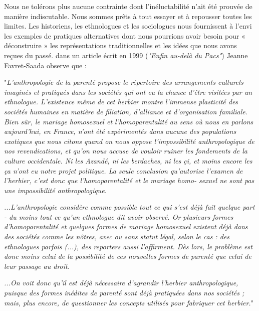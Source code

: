   Nous ne tolérons plus aucune contrainte dont l'inéluctabilité n’ait été prouvée de manière indiscutable. Nous sommes prêts à tout essayer et à repousser toutes les limites. Les historiens, les ethnologues et les sociologues nous fournissent à l'envi les exemples de pratiques alternatives dont nous pourrions avoir besoin pour « déconstruire » les représentations traditionnelles et les idées que nous avons reçues du passé.  dans un article écrit en 1999 (\emph{"Enfin au-delà du Pacs"}) Jeanne Favret-Saada observe que :
  \begin{displayquote}
  "\emph{L'anthropologie  de  la  parenté  propose  le  répertoire
des arrangements culturels imaginés et pratiqués dans
les sociétés qui ont eu la chance d'être visitées par un
ethnologue. L'existence  même  de  cet  herbier  montre
l'immense  plasticité  des  sociétés  humaines  en  matière
de filiation, d'alliance et d'organisation familiale. Bien sûr,
le mariage homosexuel et l'homoparentalité au sens où
nous en parlons aujourd'hui, en France, n'ont été expérimentés  dans  aucune  des  populations  exotiques  que
nous  citons  quand  on  nous  oppose  l'impossibilité
anthropologique de nos revendications, et qu'on nous
accuse  de  vouloir  ruiner  les  fondements  de  la  culture
occidentale. Ni les Azandé, ni les berdaches, ni les çi, et
moins encore les ça n'ont eu notre projet politique.
La  seule  conclusion  qu'autorise  l'examen  de  l'herbier,
c'est donc que l'homoparentalité et le mariage homo-
sexuel  ne  sont  pas  une  impossibilité  anthropologique.}

\emph{...L'anthropologie  considère comme possible tout ce qui s'est déjà fait quelque part - du moins tout ce qu'un ethnologue dit avoir observé. Or  plusieurs  formes  d'homoparentalité  et  quelques
formes de mariage homosexuel existent déjà dans des
sociétés  comme  les  nôtres, avec  ou  sans  statut  légal,
selon  le  cas  : des  ethnologues  parfois (...), des
reporters  aussi  l'affirment. Dès  lors, le  problème  est
donc  moins  celui  de  la  possibilité  de  ces  nouvelles
formes de parenté que celui de leur passage au droit.}

\emph{...On voit donc qu'il est déjà nécessaire d'agrandir l'herbier  anthropologique, puisque  des  formes  inédites  de
parenté  sont  déjà  pratiquées  dans  nos  sociétés ; mais,
plus  encore, de questionner  les  concepts  utilisés  pour
fabriquer cet herbier.}" 
 \end{displayquote}
 


